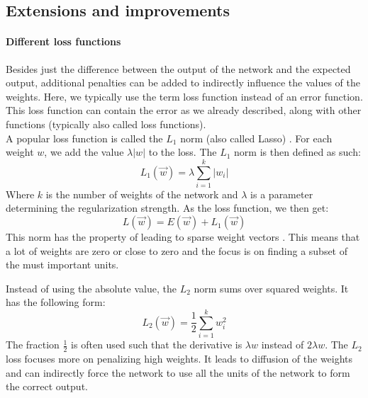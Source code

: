 \subsection{Extensions and improvements} %
\label{ssub:extensions_and_improvements}
\paragraph{Different loss functions} %
\label{par:loss_functions}
Besides just the difference between the output of the network and the expected output, additional penalties can be added to indirectly influence the values of the weights.
Here, we typically use the term loss function instead of an error function. This loss function can contain the error as we already described, along with other functions (typically also called loss functions).\\

A popular loss function is called the $L_1$ norm (also called Lasso) \citep{tibshirani1996regression}. For each weight $w$, we add the value $\lambda \vert w \vert$ to the loss. The $L_1$ norm is then defined as such:
\begin{equation}
    L_1(\overrightarrow{w}) = \lambda \sum_{i=1}^k \vert w_i \vert
\end{equation}
Where $k$ is the number of weights of the network and $\lambda$ is a parameter determining the regularization strength.
As the loss function, we then get:
\begin{equation}
    L(\overrightarrow{w}) = E(\overrightarrow{w}) + L_1(\overrightarrow{w})
\end{equation}
This norm has the property of leading to sparse weight vectors \citep{journals/ftml/BachJMO12}. This means that a lot of weights are zero or close to zero and the focus is on finding a subset of the must important units.

Instead of using the absolute value, the $L_2$ norm sums over squared weights. It has the following form:
\begin{equation}
    L_2(\overrightarrow{w}) = \frac{1}{2} \sum_{i=1}^k w_i^2
\end{equation}
The fraction $\frac{1}{2}$ is often used such that the derivative is $\lambda w$ instead of $2 \lambda w$. The $L_2$ loss focuses more on penalizing high weights. It leads to diffusion of the weights and can indirectly force the network to use all the units of the network to form the correct output.

